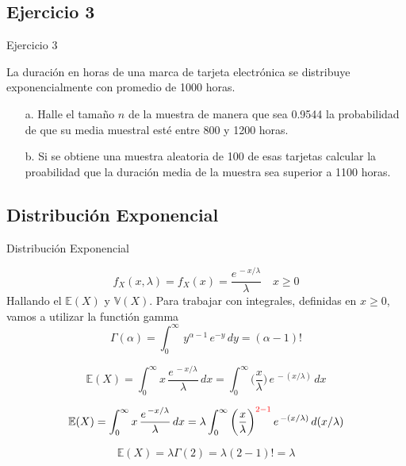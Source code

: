 \documentclass[
  ignorenonframetext,
]{beamer}
\begin{document}
\hypertarget{ejercicio-3}{%
\subsection{Ejercicio 3}\label{ejercicio-3}}

\begin{frame}{Ejercicio 3}

La duración en horas de una marca de tarjeta electrónica se distribuye
exponencialmente con promedio de 1000 horas.

\begin{itemize}\justifying 
  \item [a.] Halle el tamaño $n$ de la muestra de manera que sea 0.9544 la probabilidad de que su media muestral esté entre 800 y 1200 horas.
  \item [b.] Si se obtiene una muestra aleatoria de 100 de esas tarjetas calcular la proabilidad que la duración media de la muestra sea superior a 1100 horas.
\end{itemize}

\end{frame}

\hypertarget{distribuciuxf3n-exponencial}{%
\subsection{Distribución
Exponencial}\label{distribuciuxf3n-exponencial}}

\begin{frame}{Distribución Exponencial}

\[f_X(x,\lambda)=f_X(x)= \frac{\displaystyle e^{\,-x/\lambda} }{\lambda} \quad x\geq0\]
Hallando el \(\mathbb{E}(X)\) y \(\mathbb{V}(X)\). Para trabajar con
integrales, definidas en \(x\geq 0\), vamos a utilizar la functión gamma
\[ \Gamma(\alpha)=\displaystyle\int_{0}^{\infty}\, y^{\alpha-1}\,\displaystyle e^{-y}\,dy =(\alpha-1)!\]

\[\mathbb{E}(X)  = \displaystyle\int_{0}^{\infty}x\, \frac{\displaystyle e^{\,-x/\lambda} }{\lambda}\,dx  = \displaystyle\int_{0}^{\infty} \bigg(\frac{x}{\lambda}\bigg) \, \displaystyle e^{\,-(x /\lambda)} \,dx\]

\[\mathbb{E}(X)  = \displaystyle\int_{0}^{\infty}x\, \frac{\displaystyle e^{\,-x/\lambda} }{\lambda}\,dx =\lambda\displaystyle\int_{0}^{\infty} \bigg(\frac{x}{\lambda}\bigg)^{\color{red}2-1 } \, \displaystyle e^{\,-(x /\lambda)} \,d(x/\lambda)\]

\[\mathbb{E}(X)  =\lambda\Gamma(2)=\lambda(2-1)!=\lambda \]

\end{frame}
\end{document}
